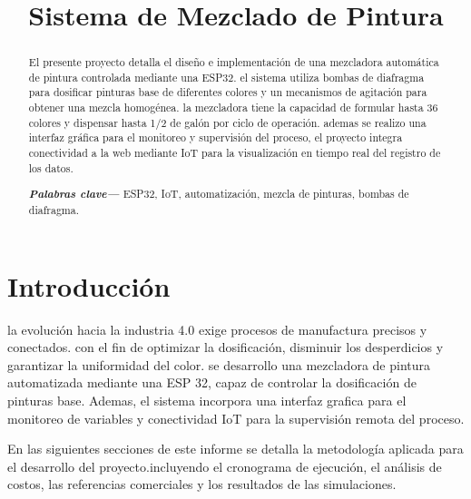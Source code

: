 \documentclass[conference]{IEEEtran}
\begin{document}
\title{Sistema de Mezclado de Pintura}

\author{
}



\maketitle
\begin{abstract}

El presente proyecto detalla el dise\~no e implementaci\'on de una mezcladora autom\'atica de pintura controlada mediante una ESP32. el sistema utiliza bombas de diafragma para dosificar pinturas base de diferentes colores y un mecanismos de agitaci\'on para obtener una mezcla homog\'enea. la mezcladora tiene la capacidad de formular  hasta 36 colores y dispensar hasta 1/2 de gal\'on por ciclo de operaci\'on. ademas se realizo una interfaz gr\'afica para el monitoreo y supervisi\'on del proceso, el proyecto integra conectividad a la web mediante IoT para la visualizaci\'on en tiempo real del registro de los datos.

\vspace{1em}
\noindent \textbf{\textit{Palabras clave---}} ESP32, IoT, automatizaci\'on, mezcla de pinturas, bombas de diafragma.
\end{abstract}

\section{Introducci\'on}

la evoluci\'on hacia la industria 4.0 exige procesos de manufactura precisos y conectados. con el fin de optimizar la dosificaci\'on, disminuir los desperdicios y garantizar la uniformidad del color. se desarrollo una mezcladora de pintura automatizada mediante una ESP 32, capaz de controlar la dosificaci\'on de pinturas base. Ademas, el sistema incorpora una interfaz grafica para el monitoreo de variables y conectividad IoT para la supervisi\'on remota del proceso.

En las siguientes secciones de este informe se detalla la metodolog\'ia aplicada para el desarrollo del proyecto.incluyendo el cronograma de ejecuci\'on, el an\'alisis de costos, las referencias comerciales y los resultados de las simulaciones.
\end{document}
